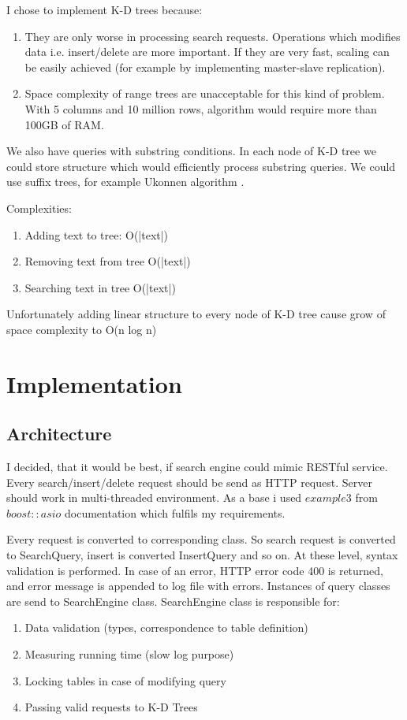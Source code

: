 \documentclass{llncs}
\newcommand{\<}{\langle}
\renewcommand{\>}{\rangle}
\begin{document}
\bigskip

I chose to implement K-D trees because:
\begin{enumerate}
\item They are only worse in processing search requests. Operations which modifies data i.e. insert/delete are more important. If they are very fast, scaling can be easily achieved (for example by implementing master-slave replication).
\item Space complexity of range trees are unacceptable for this kind of problem. With 5 columns and 10 million rows, algorithm would require more than 100GB of RAM.
\end{enumerate}

\bigskip
We also have queries with substring conditions. In each node of K-D tree we could store structure which would efficiently process substring queries. We could use suffix trees, for example Ukonnen algorithm \cite{STUKK} .

Complexities:
\begin{enumerate}
\item Adding text to tree: O(|text|)
\item Removing text from tree O(|text|)
\item Searching text in tree O(|text|)
\end{enumerate}

Unfortunately adding linear structure to every node of K-D tree cause grow of space complexity to O(n
log n)

\section{Implementation}

\subsection{Architecture}
I decided, that it would be best, if search engine could mimic RESTful service. Every search/insert/delete request should be send as HTTP request. Server should work in multi-threaded
environment. As a base i used $example3$ \cite{ASIOHTTP} from $boost::asio$ documentation which fulfils my
requirements.

Every request is converted to corresponding class. So search request is converted to SearchQuery,
insert is converted InsertQuery and so on. At these level, syntax validation is performed. In case of an
error, HTTP error code 400 is returned, and error message is appended to log file with errors.
Instances of query classes are send to SearchEngine class. SearchEngine class is responsible for:
\begin{enumerate}
\item Data validation (types, correspondence to table definition)
\item Measuring running time (slow log purpose)
\item Locking tables in case of modifying query
\item Passing valid requests to K-D Trees
\end{enumerate}
\end{document}
